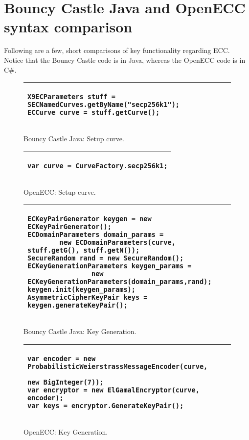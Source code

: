 \section{Bouncy Castle Java and OpenECC syntax comparison}
\label{app:bc_openecc_syntax_compare}

Following are a few, short comparisons of key functionality regarding ECC. Notice that the Bouncy Castle code is in Java,
whereas the OpenECC code is in C\#.

\begin{figure}[h!]
    \begin{tabular}{|p{\textwidth}|}
    \hline
    \begin{verbatim}
X9ECParameters stuff = SECNamedCurves.getByName("secp256k1");
ECCurve curve = stuff.getCurve();
    \end{verbatim} \\
    \hline
    \end{tabular}
    \caption{Bouncy Castle Java: Setup curve.}
\end{figure}

\begin{figure}[h!]
    \begin{tabular}{|p{\textwidth}|}
    \hline
    \begin{verbatim}
var curve = CurveFactory.secp256k1;
    \end{verbatim} \\
    \hline
    \end{tabular}
    \caption{OpenECC: Setup curve.}
\end{figure}

\begin{figure}[h!]
    \begin{tabular}{|p{\textwidth}|}
    \hline
    \begin{verbatim}
ECKeyPairGenerator keygen = new ECKeyPairGenerator();
ECDomainParameters domain_params =
        new ECDomainParameters(curve, stuff.getG(), stuff.getN());
SecureRandom rand = new SecureRandom();
ECKeyGenerationParameters keygen_params =
                new ECKeyGenerationParameters(domain_params,rand);
keygen.init(keygen_params);
AsymmetricCipherKeyPair keys = keygen.generateKeyPair();
    \end{verbatim} \\
    \hline
    \end{tabular}
    \caption{Bouncy Castle Java: Key Generation.}
\end{figure}

\begin{figure}[h!]
    \begin{tabular}{|p{\textwidth}|}
    \hline
    \begin{verbatim}
var encoder = new ProbabilisticWeierstrassMessageEncoder(curve,
                                               new BigInteger(7));
var encryptor = new ElGamalEncryptor(curve, encoder);
var keys = encryptor.GenerateKeyPair();
    \end{verbatim} \\
    \hline
    \end{tabular}
    \caption{OpenECC: Key Generation.}
\end{figure}

